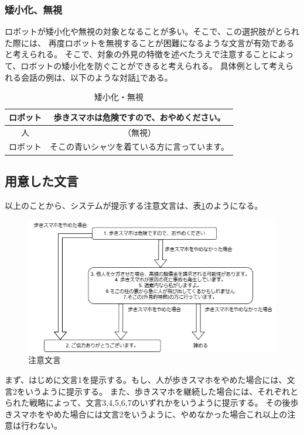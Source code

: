 \documentclass[11pt,a4j]{jreport}
\begin{document}
\subsubsection{矮小化、無視}
ロボットが矮小化や無視の対象となることが多い\cite{Schneider2022}。そこで、この選択肢がとられた際には、
再度ロボットを無視することが困難になるような文言が有効であると考えられる。
そこで、対象の外見の特徴を述べたうえで注意することによって、ロボットの矮小化を防ぐことができると考えられる。
具体例として考えられる会話の例は、以下のような対話\ref{dialogue: Ignore}である。
\begin{table}[H]
  \centering
  
  
  \begin{tabular}{c|c}
      ロボット & 歩きスマホは危険ですので、おやめください。 \\ \hline
      人 & （無視） \\ \hline
      ロボット & そこの青いシャツを着ている方に言っています。 \\ 
  \end{tabular}
  \caption{矮小化・無視}
  \label{dialogue: Ignore}
\end{table}


\subsection{用意した文言}
以上のことから、システムが提示する注意文言は、表\ref{fig: Strategy}のようになる。
\begin{figure}[h]
  
  \includegraphics[width=15cm]{img/waystostop.drawio.png}
  \caption{注意文言}
  \label{fig: Strategy}

\end{figure}
まず、はじめに文言1を提示する。もし、人が歩きスマホをやめた場合には、文言2をいうように提示する。
また、歩きスマホを継続した場合には、それぞれとられた戦略によって、文言3,4,5,6,7のいずれかをいうように提示する。
その後歩きスマホをやめた場合には文言2をいうように、やめなかった場合これ以上の注意は行わない。
\end{document}
